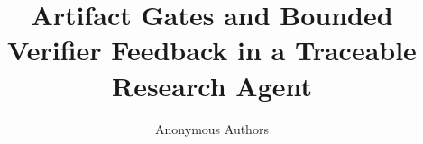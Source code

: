\documentclass{article}
\title{Artifact Gates and Bounded Verifier Feedback in a Traceable Research Agent}
\author{Anonymous Authors}
\begin{document}
\maketitle
\begin{abstract}

\end{abstract}








\clearpage
\appendix

\end{document}
